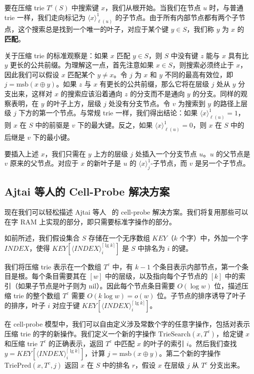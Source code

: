 \documentclass[11pt,a4paper]{ctexart}
\newcommand{\lpiece}[3]{\langle #1 \rangle_{#2}^{#3}}
\newcommand{\XOR}{\oplus}
\newcommand{\MSB}{\text{msb}}
\newcommand{\ceiling}[1]{\lceil #1 \rceil}
\begin{document}
要在压缩 trie $T^c(S)$ 中搜索键 $x$，我们从根开始。当我们在节点 $u$ 时，与普通 trie 一样，我们走向标记为 $\lpiece{x}{\ell(u)}{1}$ 的子节点。由于所有内部节点都有两个子节点，这个搜索总是找到一个唯一的叶子，对应于某个键 $y \in S$，我们称 $y$ 为 $x$ 的\textbf{匹配}。

关于压缩 trie 的标准观察是：如果 $x$ 匹配 $y \in S$，则 $S$ 中没有键 $z$ 能与 $x$ 具有比 $y$ 更长的公共前缀。为理解这一点，首先注意如果 $x \in S$，则搜索必须终止于 $x$，因此我们可以假设 $x$ 匹配某个 $y \neq x$。令 $j$ 为 $x$ 和 $y$ 不同的最高有效位，即 $j = \MSB(x \XOR y)$。如果 $z$ 与 $x$ 有更长的公共前缀，那么它将在层级 $j$ 处从 $y$ 分支出来，这样对 $x$ 的搜索应该沿着通向 $z$ 的分支而不是通向 $y$ 的分支。同样的观察表明，在 $y$ 的叶子上方，层级 $j$ 处没有分支节点。令 $v$ 为搜索到 $y$ 的路径上层级 $j$ 下方的第一个节点。与常规 trie 一样，我们得出结论：如果 $\lpiece{x}{\ell(u)}{1} = 1$，则 $x$ 在 $S$ 中的前驱是 $v$ 下的最大键。反之，如果 $\lpiece{x}{\ell(u)}{1} = 0$，则 $x$ 在 $S$ 中的后继是 $v$ 下的最小键。

要插入上述 $x$，我们只需在 $y$ 上方的层级 $j$ 处插入一个分支节点 $u$。$u$ 的父节点是 $v$ 原来的父节点。对应于 $x$ 的新叶子是 $u$ 的 $\lpiece{x}{j}{1}$-子节点，而 $v$ 是另一个子节点。

\subsection{Ajtai 等人的 Cell-Probe 解决方案}

现在我们可以轻松描述 Ajtai 等人~\cite{ajtai84hashing} 的 cell-probe 解决方案。我们将复用那些可以在字 RAM 上实现的部分，即只需要标准字操作的部分。

如前所述，我们假设集合 $S$ 存储在一个无序数组 $KEY$（$k$ 个字）中，外加一个字 $INDEX$，使得 $KEY[\lpiece{INDEX}{i}{\ceiling{\lg k}}]$ 是 $S$ 中排名为 $i$ 的键。

我们将压缩 trie 表示在一个数组 $T^c$ 中，有 $k-1$ 个条目表示内部节点，第一个条目是根。每个条目需要其在 $[w]$ 中的层级，以及指向每个子节点的 $[k]$ 中的索引（如果子节点是叶子则为 nil）。因此每个节点条目需要 $O(\log w)$ 位，描述压缩 trie 的整个数组 $T^c$ 需要 $O(k\log w) = o(w)$ 位。子节点的排序诱导了叶子的排序，叶子 $i$ 对应于键 $KEY[\lpiece{INDEX}{i}{\ceiling{\lg k}}]$。

在 cell-probe 模型中，我们可以自由定义涉及常数个字的任意字操作，包括对表示压缩 trie 的字的新操作。我们定义一个新的字操作 $\text{TrieSearch}(x, T^c)$，给定键 $x$ 和压缩 trie $T^c$ 的正确表示，返回 $T^c$ 中匹配 $x$ 的叶子的索引 $i$。然后我们查找 $y = KEY[\lpiece{INDEX}{i}{\ceiling{\lg k}}]$，计算 $j = \MSB(x \XOR y)$。第二个新的字操作 $\text{TriePred}(x, T^c, j)$ 返回 $x$ 在 $S$ 中的排名 $r$，假设 $x$ 在层级 $j$ 从 $T^c$ 分支出来。
\end{document}

